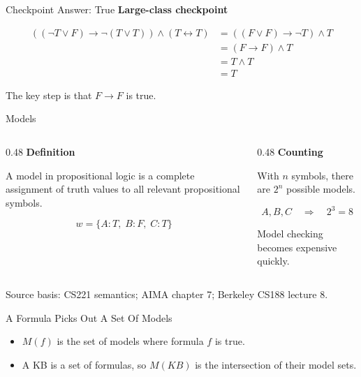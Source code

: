 \documentclass[aspectratio=169,11pt]{beamer}
\newcommand{\minihead}[1]{\textbf{\color{unswblue}#1}}
\newcommand{\activity}{\textbf{\color{unsworange}Large-class checkpoint}}
\newcommand{\source}[1]{\vfill{\scriptsize\color{darkgrey}Source basis: #1}}
\newcommand{\model}[1]{\{#1\}}
\begin{document}
\begin{frame}{Checkpoint Answer: True}
  \activity

  \[
  \begin{aligned}
    ((\neg T \lor F) \rightarrow \neg(T \lor T)) \land (T \leftrightarrow T)
      &= ((F \lor F) \rightarrow \neg T) \land T\\
      &= (F \rightarrow F) \land T\\
      &= T \land T\\
      &= T
  \end{aligned}
  \]

  The key step is that $F \rightarrow F$ is true.
\end{frame}

\begin{frame}{Models}
  \begin{columns}[T,onlytextwidth]
    \begin{column}{0.48\textwidth}
      \minihead{Definition}

      A model in propositional logic is a complete assignment of truth values to all relevant propositional symbols.

      \[
        w = \model{A:T,\;B:F,\;C:T}
      \]
    \end{column}
    \begin{column}{0.48\textwidth}
      \minihead{Counting}

      With $n$ symbols, there are $2^n$ possible models.

      \[
        A,B,C \quad \Rightarrow \quad 2^3 = 8
      \]

      Model checking becomes expensive quickly.
    \end{column}
  \end{columns}

  \source{CS221 semantics; AIMA chapter 7; Berkeley CS188 lecture 8.}
\end{frame}

\begin{frame}{A Formula Picks Out A Set Of Models}
  \begin{center}
  \end{center}

  \begin{itemize}
    \item $M(f)$ is the set of models where formula $f$ is true.
    \item A KB is a set of formulas, so $M(KB)$ is the intersection of their model sets.
  \end{itemize}
\end{frame}
\end{document}
